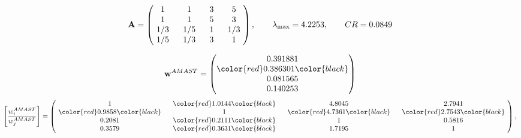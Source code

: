\begin{example}
\begin{equation*}
\mathbf{A} =
\begin{pmatrix}
$\,\,$ 1 $\,\,$ & $\,\,$1$\,\,$ & $\,\,$3$\,\,$ & $\,\,$5 $\,\,$ \\
$\,\,$ 1 $\,\,$ & $\,\,$ 1 $\,\,$ & $\,\,$5$\,\,$ & $\,\,$3 $\,\,$ \\
$\,\,$ 1/3$\,\,$ & $\,\,$ 1/5$\,\,$ & $\,\,$ 1 $\,\,$ & $\,\,$ 1/3 $\,\,$ \\
$\,\,$ 1/5$\,\,$ & $\,\,$ 1/3$\,\,$ & $\,\,$3$\,\,$ & $\,\,$ 1  $\,\,$ \\
\end{pmatrix},
\qquad
\lambda_{\max} =
4.2253,
\qquad
CR = 0.0849
\end{equation*}

\begin{equation*}
\mathbf{w}^{AMAST} =
\begin{pmatrix}
0.391881\\
\color{red} 0.386301\color{black} \\
0.081565\\
0.140253
\end{pmatrix}\end{equation*}
\begin{equation*}
\left[ \frac{{w}^{AMAST}_i}{{w}^{AMAST}_j} \right] =
\begin{pmatrix}
$\,\,$ 1 $\,\,$ & $\,\,$\color{red} 1.0144\color{black} $\,\,$ & $\,\,$4.8045$\,\,$ & $\,\,$2.7941$\,\,$ \\
$\,\,$\color{red} 0.9858\color{black} $\,\,$ & $\,\,$ 1 $\,\,$ & $\,\,$\color{red} 4.7361\color{black} $\,\,$ & $\,\,$\color{red} 2.7543\color{black}   $\,\,$ \\
$\,\,$0.2081$\,\,$ & $\,\,$\color{red} 0.2111\color{black} $\,\,$ & $\,\,$ 1 $\,\,$ & $\,\,$0.5816 $\,\,$ \\
$\,\,$0.3579$\,\,$ & $\,\,$\color{red} 0.3631\color{black} $\,\,$ & $\,\,$1.7195$\,\,$ & $\,\,$ 1  $\,\,$ \\
\end{pmatrix},
\end{equation*}


\end{example}
